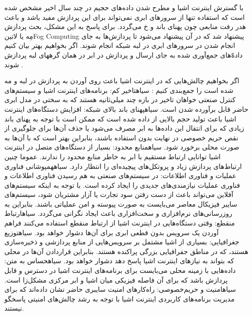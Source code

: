 
با گسترش اینترنت اشیا و مطرح شدن داده‌های حجیم در چند سال اخیر مشخص شده است که استفاده تنها از سرورهای ابری نمی‌تواند برای این پردازش مفید باشد و باعث هدر رفت منابعی چون پهنای باند و ‌خ می‌گردد.
برای پاسخ به این مشکل، بحث پردازش مِه یا ‌لاتین{Fog Computing} پیشنهاد شد که در آن پیشنهاد می‌شود تا پردازش‌ها به جای انجام شدن در سرورهای ابری در لبه شبکه انجام شوند.
اگر بخواهیم بهتر بیان کنیم داده‌ّهای جمع‌آوری شده به جای ارسال و پردازش در ابر در همان گرههای لبه پردازش شوند
.

اگر بخواهیم چالش‌هایی که در اینترنت اشیا باعث روی آوردن به پردازش در لبه و مه شده است را جمع‌بندی کنیم
:
 ‌سیاه{تاخیر کم}: برنامه‌های اینترنت اشیا و سیستم‌های کنترل صنعتی خواهان تاخیر در بازه چند میلی‌ثانیه هستند که به سختی در مدل ابری حاضر قابل برآورده شدن است.
 ‌سیاه{پهنای باند بالای شبکه}: افزایش دستگاه‌های اینترنت اشیا باعث تولید حجم بالایی از داده شده است که ممکن است با توجه به پهنای باند زیادی که برای
انتقال این داده‌ها به ابر مصرف می‌شود یا حذف آن‌ها برای جلوگیری از نقص حریم خصوصی در نهایت
بدون استفاده باشند، بنابراین بهتر است که با آن‌ها به صورت محلی برخورد شود.
 ‌سیاه{منابع محدود}: بسیار از دستگاه‌های متصل در اینترنت اشیا توانایی ارتباط مستقیم با ابر به خاطر منابع محدود را ندارند. عموما چنین ارتباط‌های پردازش زیاد و پروتکل‌های پیچیده‌ای را انتظار دارد.
 ‌سیاه{همپوشانی فناوری عملیات و فناوری اطلاعات}: در سیستم‌های صنعتی به هم رسیدن فناوری اطلاعات و فناوری عملیات نیازمندی‌های جدیدی را ایجاد کرده است. با توجه به اینکه سیستم‌های آفلاین
می‌تواند باعث از دست رفتن سود تجارت یا آزار مشتریان شود، سیستم‌های سایبر فیزیکال معاصر می‌بایست به صورت پیوسته و امن عملیاتی باشند. بنابراین به روزرسانی‌های نرم‌افزاری و سخت‌افزاری باعث ایجاد نگرانی می‌گردد.
 ‌سیاه{ارتباط منقطع}: وقتی دستگاه‌هایی در اینترنت اشیا از ارتباط منقطع استفاده می‌کنند فراهم آوردن یک سرویس بدون قطعی ابری برای آن‌ها دشوار خواهد بود.
 ‌سیاه{توزیع جغرافیایی}: بسیاری از اشیا مشتمل بر سرویس‌هایی از منابع پردازشی و ذخیره‌سازی هستند، که در مناطق جفرافیایی بزرگی پراکنده هستند. بنابراین قراردادن آن‌ها در محلی که بتواند به نیازهای اینترنت اشیا پاسخ دهد
دشوار خواهد بود.
 ‌سیاه{حساس به متن}: داده‌هایی با زمینه محلی می‌بایست برای برنامه‌های اینترنت اشیا در دسترس و قابل پردازش باشد که برای آن فاصله فیزیکی میان اشیا و ابر مرکزی مشکل‌زا است.
 ‌سیاه{امنیت و حریم‌خصوصی}: راه‌کارهای امنیت سایبری حاضر نشان داده‌اند که برای مدیریت برنامه‌های کاربردی اینترنت اشیا با توجه به رشد چالش‌های امنیتی پاسخگو نیستند.

